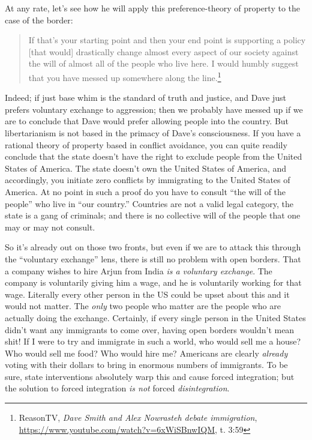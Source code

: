 \documentclass[11pt]{article}
\begin{document}
At any rate, let's see how he will apply this preference-theory of property to the case of the border:
\begin{quote}
If that's your starting point and then your end point is supporting a policy [that would] drastically change almost every aspect of our society against the will of almost all of the people who live here. I would humbly suggest that you have messed up somewhere along the line.\footnote{ReasonTV, \emph{Dave Smith and Alex Nowrasteh debate immigration}, \url{https://www.youtube.com/watch?v=6xWiSBnwIQM}, t. 3:59}
\end{quote}

Indeed; if just base whim is the standard of truth and justice, and Dave just prefers voluntary exchange to aggression; then we probably have messed up if we are to conclude that Dave would prefer allowing people into the country. But libertarianism is not based in the primacy of Dave's consciousness. If you have a rational theory of property based in conflict avoidance, you can quite readily conclude that the state doesn't have the right to exclude people from the United States of America. The state doesn't own the United States of America, and accordingly, you initiate zero conflicts by immigrating to the United States of America. At no point in such a proof do you have to consult ``the will of the people'' who live in ``our country.'' Countries are not a valid legal category, the state is a gang of criminals; and there is no collective will of the people that one may or may not consult.

So it's already out on those two fronts, but even if we are to attack this through the ``voluntary exchange'' lens, there is still no problem with open borders. That a company wishes to hire Arjun from India \emph{is a voluntary exchange}. The company is voluntarily giving him a wage, and he is voluntarily working for that wage. Literally every other person in the US could be upset about this and it would not matter. The \emph{only} two people who matter are the people who are actually doing the exchange. Certainly, if every single person in the United States didn't want any immigrants to come over, having open borders wouldn't mean shit! If I were to try and immigrate in such a world, who would sell me a house? Who would sell me food? Who would hire me? Americans are clearly \emph{already} voting with their dollars to bring in enormous numbers of immigrants. To be sure, state interventions absolutely warp this and cause forced integration; but the solution to forced integration \emph{is not} forced \emph{disintegration}.
\end{document}
